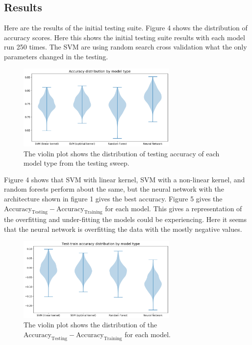 \documentclass[12pt]{article}
\begin{document}
\subsection{Results}

Here are the results of the initial testing suite. Figure 4 shows the distribution of accuracy scores. Here this shows the initial testing suite results with each model run 250 times. The SVM are using random search cross validation what the only parameters changed in the testing. 

\begin{figure}[H]
\centering
\includegraphics[width=0.7\textwidth]{testOut}
\caption{The violin plot shows the distribution of testing accuracy of each model type from the testing sweep.}
\end{figure}
Figure 4 shows that SVM with linear kernel, SVM with a non-linear kernel, and random forests perform about the same, but the neural network with the architecture shown in figure 1 gives the best accuracy. Figure 5 gives the $\text{Accuracy}_{\text{Testing}} - \text{Accuracy}_{\text{Training}}$ for each model. This gives a representation of the overfitting and under-fitting the models could be experiencing. Here it seems that the neural network is overfitting the data with the mostly negative values.
\begin{figure}[H]
\centering
\includegraphics[width=0.7\textwidth]{testOut2}
\caption{The violin plot shows the distribution of the $\text{Accuracy}_{\text{Testing}} - \text{Accuracy}_{\text{Training}}$
for each model. }
\end{figure}
\end{document}
